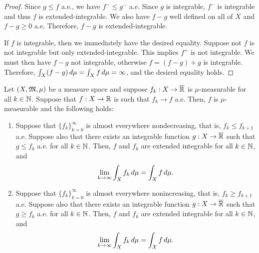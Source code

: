 \documentclass[a4paper]{article}
\renewcommand{\seqinfk}[1]{\{ #1 \}_{k=0}^\infty}
\begin{document}
\begin{proof}
Since $g \leq f$ a.e., we have $f^- \leq g^-$ a.e. Since
$g$ is integrable, $f^-$ is integrable and thus $f$ is
extended-integrable. We also have $f - g$ well defined
on all of $X$ and $f - g \geq 0$ a.e. Therefore,
$f - g$ is extended-integrable.

If $f$ is integrable, then we immediately have the desired
equality. Suppose not $f$ is not integrable but only
extended-integrable. This implies $f^+$ is not integrable.
We must then have $f - g$ not integrable, otherwise
$f = (f - g) + g$ is integrable. Therefore,
$\int_X (f - g) \, d \mu = \int_X f \, d \mu = \infty$,
and the desired equality holds.
\end{proof}

\begin{thm}
Let $(X, \mathfrak{M}, \mu)$ be a measure space and suppose
$f_k : X \to \overline{\mathbb{R}}$ is $\mu$-measurable for
all $k \in \mathbb{N}$. Suppose that
$f: X \to \mathbb{R}$ is such that $f_k \to f$ a.e. Then,
$f$ is $\mu$-measurable and the following holds:
\begin{enumerate}
\item Suppose that $\seqinfk{f_k}$ is almost everywhere
nondecreasing, that is, $f_k \leq f_{k+1}$ a.e. Suppose
also that there exists an integrable function
$g : X \to \overline{\mathbb{R}}$ such that $g \leq f_k$ a.e. for all $k \in \mathbb{N}$.
Then, $f$ and $f_k$ are extended integrable for all $k \in \mathbb{N}$,
and
\[
\lim_{k \to \infty} \int_X f_k \, d \mu = \int_X f \, d \mu.
\]

\item Suppose that $\seqinfk{f_k}$ is almost everywhere
nonincreasing, that is, $f_k \geq f_{k+1}$ a.e. Suppose
also that there exists an integrable function
$g : X \to \overline{\mathbb{R}}$ such that $g \geq f_k$ a.e. for all $k \in \mathbb{N}$.
Then, $f$ and $f_k$ are extended integrable for all $k \in \mathbb{N}$,
and
\[
\lim_{k \to \infty} \int_X f_k \, d \mu = \int_X f \, d \mu.
\]
\end{enumerate}
\end{thm}
\end{document}
